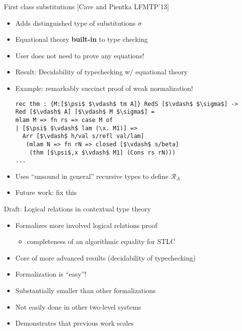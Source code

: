 \documentclass[usenames,dvipsnames]{beamer}
\begin{document}
\begin{frame}[fragile]{First class substitutions [Cave and Pientka LFMTP'13]}
\begin{itemize}
\item Adds distinguished type of substitutions $\sigma$
\item Equational theory \textbf{built-in} to type checking
\item User does not need to prove any equations!
\item Result: Decidability of typechecking w/ equational theory
\item Example: remarkably succinct proof of weak normalization!
\begin{lstlisting}
rec thm : {M:[$\psi$ $\vdash$ tm A]} RedS [$\vdash$ $\sigma$] -> Red [$\vdash$ A] [$\vdash$ M $\sigma$] =
mlam M => fn rs => case M of
| [$\psi$ $\vdash$ lam (\x. M1)] =>
  Arr [$\vdash$ h/val s/refl val/lam]
   (mlam N => fn rN => closed [$\vdash$ s/beta]
    (thm [$\psi$,x $\vdash$ M1] (Cons rs rN)))
...
\end{lstlisting}
\item Uses ``unsound in general'' recursive types to define $\mathcal{R}_A$
\item Future work: fix this
\end{itemize}
\end{frame}

\begin{frame}{Draft: Logical relations in contextual type theory}
\begin{itemize}
\item Formalizes more involved logical relations proof
\begin{itemize}
\item completeness of an algorithmic equality for STLC
\end{itemize}
\item Core of more advanced results (decidability of typechecking)
\item Formalization is ``easy''!
\item Substantially smaller than other formalizations
\item Not easily done in other two-level systems
\item Demonstrates that previous work scales
\end{itemize}
\end{frame}
\end{document}
